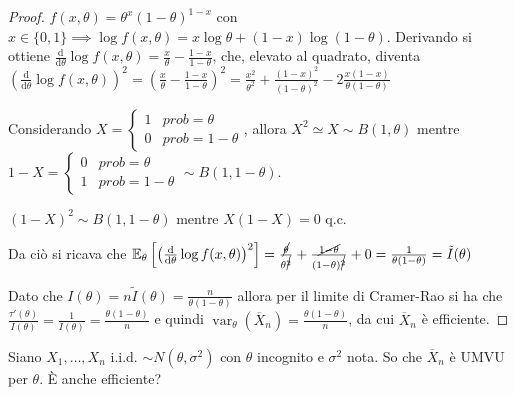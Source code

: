 \documentclass[hidelinks, 10pt]{report}
\DeclareMathOperator{\var}{var}
\begin{document}
\begin{proof}
$ f(x, \theta) = \theta^{x} (1 - \theta)^{1 - x} $ con $ x \in \{ 0, 1 \} \implies \log f(x, \theta) = x \log \theta + (1 - x) \log (1 - \theta) $. Derivando si ottiene $ \frac{\mathrm{d}}{\mathrm{d} \theta} \log f(x, \theta) = \frac{x}{\theta} - \frac{1 - x}{1 - \theta} $, che, elevato al quadrato,  diventa $ \left( \frac{\mathrm{d}}{\mathrm{d} \theta} \log f(x, \theta) \right)^{2} = \left( \frac{x}{\theta} - \frac{1 - x}{1 - \theta} \right)^{2} = \frac{x^{2}}{\theta^{2}} + \frac{(1 - x)^{2}}{(1 - \theta)^{2}} - 2 \frac{x (1 - x)}{\theta (1 - \theta)} $

Considerando $ X = \begin{cases} 1 & prob = \theta \\ 0 & prob = 1 - \theta \end{cases} $, allora $ X^{2} \simeq X \sim B(1, \theta) $ mentre $ 1 - X = \begin{cases} 0 & prob = \theta \\ 1 & prob = 1 - \theta \end{cases} \sim B (1, 1 - \theta) $.

$ (1 - X)^{2} \sim B(1, 1 - \theta) $ mentre $ X(1 - X) = 0 $ q.c.

Da ci\`o si ricava che $ \mathbb{E}_{\theta} \left[ \left( \frac{\mathrm{d}}{\mathrm{d} \theta} \log f(x, \theta) \right)^{2} \right] = \frac{\cancel{\theta}}{\theta^{\cancel{2}}} + \frac{\cancel{1 - \theta}}{(1 - \theta)^{\cancel{2}}} + 0 = \frac{1}{\theta(1 - \theta)} = \tilde{I}(\theta) $

Dato che $ I(\theta) = n \tilde{I} (\theta) = \frac{n}{\theta (1 - \theta)} $ allora per il limite di Cramer-Rao si ha che $ \frac{\tau'(\theta)}{I(\theta)} = \frac{1}{I(\theta)} = \frac{\theta (1 - \theta)}{n} $ e quindi $ \var_{\theta} (\overline{X}_{n}) = \frac{\theta(1 - \theta)}{n} $, da cui $ \overline{X}_{n} $ \`e efficiente.
\end{proof}

\begin{ex}
Siano $ X_{1}, \dotsc, X_{n} $ i.i.d. $ \sim N(\theta, \sigma^{2}) $ con $ \theta $ incognito e $ \sigma^{2} $ nota. So che $ \overline{X}_{n} $ \`e UMVU per $ \theta $. \`E anche efficiente?
\end{ex}
\end{document}
